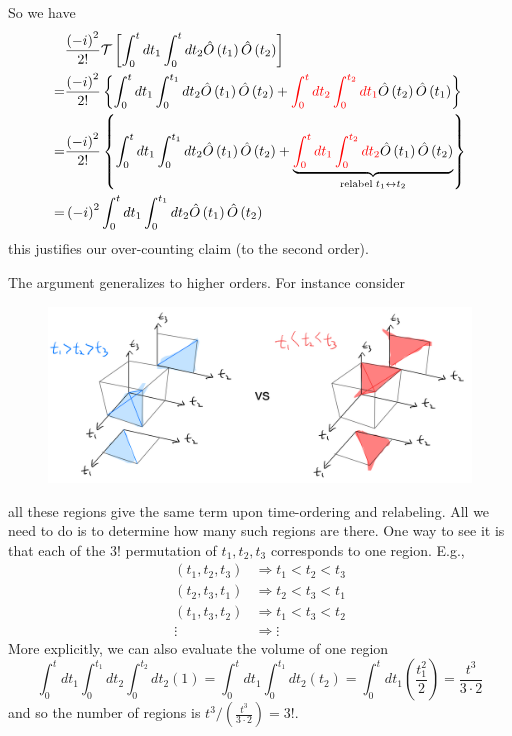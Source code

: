 So we have
\begin{align*}
    &\frac{\left( -i \right) ^2}{2!}\mathcal{T} \left[ \int_0^t{dt_1\int_0^t{dt_2\hat{O}\left( t_1 \right) \hat{O}\left( t_2 \right)}} \right] \\
    =&\frac{\left( -i \right) ^2}{2!}\left\{ \int_0^t{dt_1\int_0^{t_1}{dt_2\hat{O}\left( t_1 \right) \hat{O}\left( t_2 \right)}}+{\color{red} \int_0^t{dt_2\int_0^{t_2}{dt_1{\color{black}\hat{O}\left( t_2 \right) \hat{O}\left( t_1 \right)}}}} \right\} \\
    =&\frac{\left( -i \right) ^2}{2!}\left\{ \int_0^t{dt_1\int_0^{t_1}{dt_2\hat{O}\left( t_1 \right) \hat{O}\left( t_2 \right)}}+\underset{\mathrm{relabel}\; t_1\leftrightarrow t_2}{\underbrace{{\color{red} \int_0^t{dt_1\int_0^{t_2}{dt_2{\color{black}\hat{O}\left( t_1 \right) \hat{O}\left( t_2 \right)}}}}}} \right\} \\
    =&\left( -i \right) ^2\int_0^t{dt_1\int_0^{t_1}{dt_2\hat{O}\left( t_1 \right) \hat{O}\left( t_2 \right)}}
\end{align*}
this justifies our over-counting claim (to the second order).

The argument generalizes to higher orders. For instance consider

\begin{figure}[ht]
    \centering
    \includegraphics[width=\textwidth]{jupyterbook/data/fig/lec09-fig01.png}
\end{figure}

all these regions give the same term upon time-ordering and relabeling. All we need to do is to determine how many such regions are there. One way to see it is that each of the $3!$ permutation of $t_1,t_2,t_3$ corresponds to one region. E.g.,
\begin{align*}
    \left( t_1,t_2,t_3 \right) &\Rightarrow t_1<t_2<t_3\\
    \left( t_2,t_3,t_1 \right) &\Rightarrow t_2<t_3<t_1\\
    \left( t_1,t_3,t_2 \right) &\Rightarrow t_1<t_3<t_2\\
    \vdots &\Rightarrow \vdots
\end{align*}
More explicitly, we can also evaluate the volume of one region
\[ \int_0^t{dt_1\int_0^{t_1}{dt_2\int_0^{t_2}{dt_2\left( 1 \right)}}}=\int_0^t{dt_1\int_0^{t_1}{dt_2\left( t_2 \right)}}=\int_0^t{dt_1\left( \frac{t_{1}^{2}}{2} \right)}=\frac{t^3}{3\cdot 2}\]
and so the number of regions is $t^3/\left( \frac{t^3}{3\cdot 2} \right) =3!$.

